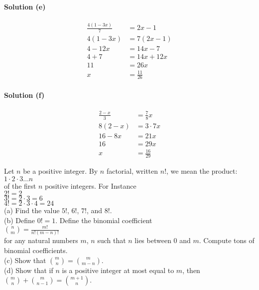 \paragraph{Solution (e)}
\begin{align*}
\frac{4(1-3x)}{7} &= 2x - 1 \\
4(1 - 3x) &= 7(2x - 1) \\
4 - 12x &= 14x - 7 \\
4 + 7 &= 14x + 12x \\
11 &= 26x \\
x &= \frac{11}{26}
\end{align*}

\paragraph{Solution (f)}
\begin{align*}
\frac{2 - x}{3} &= \frac{7}{8}x \\
8(2 - x) &= 3 \cdot 7x \\
16 - 8x &= 21x \\
16 &= 29x \\
x &= \frac{16}{29}
\end{align*}


\begin{tcolorbox}[title=Problem 6, breakable]
Let $n$ be a positive integer. By $n$ factorial, written $n!$, we mean the product: \\
$1 \cdot 2 \cdot 3 \ldots n$ \\
of the first $n$ positive integers. For Instance \\
$2! = 2$ \\
$3! = 2 \cdot 3 = 6 $ \\
$4! = 2 \cdot 3 \cdot 4 = 24$ \\
(a) Find the value $5!$, $6!$, $7!$, and $8!$. \\
(b) Define $0! = 1$. Define the binomial coefficient \\
$\binom{n}{m} = \frac{m!}{n!(m-n)!}$ \\
for any natural numbers $m$, $n$ such that $n$ lies between $0$ and $m$.
Compute tons of binomial coefficients. \\
(c) Show that $\binom{m}{n} = \binom{m}{m - n}$. \\
(d) Show that if $n$ is a positive integer at most equal to $m$, then \\
$\binom{m}{n} + \binom{m}{n - 1} = \binom{m + 1}{n}$.
\end{tcolorbox}

